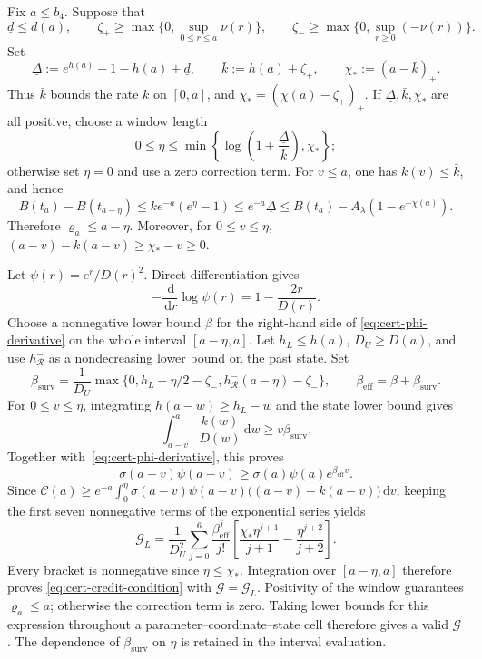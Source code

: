\documentclass[11pt]{article}
\theoremstyle{definition}
\theoremstyle{remark}
\newcommand{\dd}{\,\mathrm d}
\begin{document}
Fix $a\le b_4$.  Suppose that
\[
 \underline d\le d(a),\qquad
 \zeta_+\ge \max\{0,\sup_{0\le r\le a}\nu(r)\},\qquad
 \zeta_-\ge \max\{0,\sup_{r\ge0}(-\nu(r))\}.
\]
Set
\[
 \underline\Delta
 :=e^{h(a)}-1-h(a)+\underline d,
 \qquad
 \bar k:=h(a)+\zeta_+,
 \qquad
 \chi_*:=(a-\bar k)_+.
\]
Thus $\bar k$ bounds the rate $k$ on $[0,a]$, and $\chi_*=(\chi(a)-\zeta_+)_+$.
If $\underline\Delta,\bar k,\chi_*$ are all positive, choose a window length
\begin{equation}\label{eq:cert-credit-window}
 0\le\eta\le\min\left\{\log\left(1+\frac{\underline\Delta}{\bar k}\right),\chi_*\right\};
\end{equation}
otherwise set $\eta=0$ and use a zero correction term.
For $v\le a$, one has $k(v)\le \bar k$, and hence
\[
 B(t_a)-B(t_{a-\eta})\le \bar ke^{-a}(e^{\eta}-1)
 \le e^{-a}\underline\Delta
 \le B(t_a)-A_\lambda(1-e^{-\chi(a)}).
\]
Therefore $\varrho_a\le a-\eta$.  Moreover, for $0\le v\le\eta$,
$(a-v)-k(a-v)\ge \chi_*-v\ge0$.

Let $\psi(r)=e^r/D(r)^2$.  Direct differentiation gives
\begin{equation}\label{eq:cert-phi-derivative}
 -\frac{\dd}{\dd r}\log\psi(r)=1-\frac{2r}{D(r)}.
\end{equation}
Choose a nonnegative lower bound $\beta$ for the right-hand side of
\eqref{eq:cert-phi-derivative} on the whole interval
$[a-\eta,a]$.  Let $h_L\le h(a)$, $D_U\ge D(a)$, and use
$h^-_{\mathcal R}$ as a nondecreasing lower bound on the past state.  Set
\[
 \beta_{\mathrm{surv}}=\frac1{D_U}\max\{0,h_L-\eta/2-\zeta_-,
                         h^-_{\mathcal R}(a-\eta)-\zeta_-\},
 \qquad \beta_{\mathrm{eff}}=\beta+\beta_{\mathrm{surv}}.
\]
For $0\le v\le\eta$, integrating $h(a-w)\ge h_L-w$ and the state lower
bound gives
\[
 \int_{a-v}^{a}\frac{k(w)}{D(w)}\dd w\ge v\beta_{\mathrm{surv}}.
\]
Together with~\eqref{eq:cert-phi-derivative}, this proves
\[
 \sigma(a-v)\psi(a-v)\ge \sigma(a)\psi(a)e^{\beta_{\mathrm{eff}}v}.
\]
Since $\mathcal C(a)\ge e^{-a}\int_0^{\eta}\sigma(a-v)\psi(a-v)\bigl((a-v)-k(a-v)\bigr)\dd v$,
keeping the first seven nonnegative terms of the exponential series yields
\begin{equation}\label{eq:cert-tonelli-credit}
 \mathcal G_L=\frac1{D_U^2}\sum_{j=0}^6\frac{\beta_{\mathrm{eff}}^j}{j!}
 \left[\frac{\chi_*\eta^{j+1}}{j+1}-\frac{\eta^{j+2}}{j+2}\right].
\end{equation}
Every bracket is nonnegative since $\eta\le\chi_*$.
Integration over $[a-\eta,a]$ therefore proves
\eqref{eq:cert-credit-condition} with $\mathcal G=\mathcal G_L$.  Positivity of the window guarantees $\varrho_a\le a$; otherwise
the correction term is zero.  Taking lower bounds for this expression throughout
a parameter--coordinate--state cell therefore gives a valid $\mathcal G$.
The dependence of $\beta_{\mathrm{surv}}$ on $\eta$ is retained in the interval evaluation.
\end{document}
